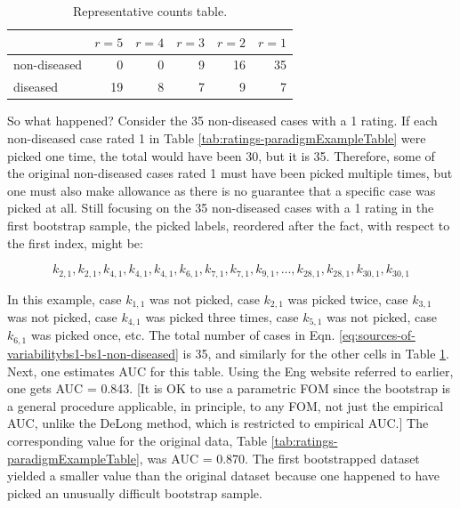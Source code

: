 \documentclass[
]{book}
\begin{document}
\begin{table}

\caption{\label{tab:sources-of-variabilitybs1}Representative counts table.}
\centering
\begin{tabular}[t]{l|r|r|r|r|r}
\hline
  & $r = 5$ & $r = 4$ & $r = 3$ & $r = 2$ & $r = 1$\\
\hline
non-diseased & 0 & 0 & 9 & 16 & 35\\
\hline
diseased & 19 & 8 & 7 & 9 & 7\\
\hline
\end{tabular}
\end{table}

So what happened? Consider the 35 non-diseased cases with a 1 rating. If each non-diseased case rated 1 in Table \ref{tab:ratings-paradigmExampleTable} were picked one time, the total would have been 30, but it is 35. Therefore, some of the original non-diseased cases rated 1 must have been picked multiple times, but one must also make allowance as there is no guarantee that a specific case was picked at all. Still focusing on the 35 non-diseased cases with a 1 rating in the first bootstrap sample, the picked labels, reordered after the fact, with respect to the first index, might be:

\begin{equation} 
k_{2,1},k_{2,1},k_{4,1},k_{4,1},k_{4,1},k_{6,1},k_{7,1},k_{7,1},k_{9,1},...,k_{28,1},k_{28,1},k_{30,1},k_{30,1}
\label{eq:sources-of-variabilitybs1-bs1-non-diseased}
\end{equation}

In this example, case \(k_{1,1}\) was not picked, case \(k_{2,1}\) was picked twice, case \(k_{3,1}\) was not picked, case \(k_{4,1}\) was picked three times, case \(k_{5,1}\) was not picked, case \(k_{6,1}\) was picked once, etc. The total number of cases in Eqn. \eqref{eq:sources-of-variabilitybs1-bs1-non-diseased} is 35, and similarly for the other cells in Table \ref{tab:sources-of-variabilitybs1}. Next, one estimates AUC for this table. Using the Eng website referred to earlier, one gets AUC = 0.843. {[}It is OK to use a parametric FOM since the bootstrap is a general procedure applicable, in principle, to any FOM, not just the empirical AUC, unlike the DeLong method, which is restricted to empirical AUC.{]} The corresponding value for the original data, Table \ref{tab:ratings-paradigmExampleTable}, was AUC = 0.870. The first bootstrapped dataset yielded a smaller value than the original dataset because one happened to have picked an unusually difficult bootstrap sample.
\end{document}
